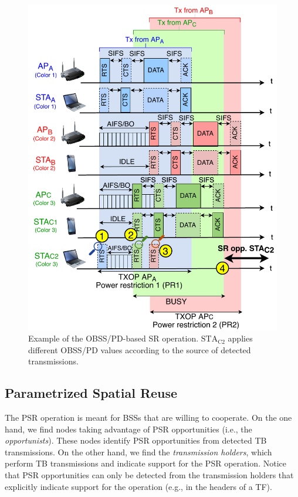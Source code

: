 \documentclass{ieeeaccess}
\begin{document}
\begin{figure}[ht!]
	\centering
	\includegraphics[width=\columnwidth]{fig_12}
	\caption{Example of the OBSS/PD-based SR operation. $\text{STA}_\text{C2}$ applies different OBSS/PD values according to the source of detected transmissions.}
	\label{fig:fig_12}
\end{figure}

\subsection{Parametrized Spatial Reuse}
\label{section:srp_based}	
The PSR operation is meant for BSSs that are willing to cooperate. On the one hand, we find nodes taking advantage of PSR opportunities (i.e., the \emph{opportunists}). These nodes identify PSR opportunities from detected TB transmissions. On the other hand, we find the \emph{transmission holders}, which perform TB transmissions and indicate support for the PSR operation. Notice that PSR opportunities can only be detected from the transmission holders that explicitly indicate support for the operation (e.g., in the headers of a TF).
\end{document}
